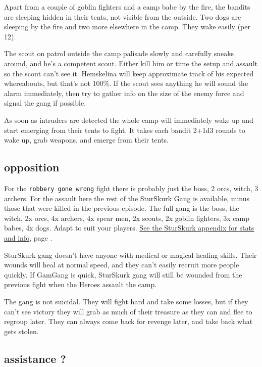 Apart from a couple of goblin fighters and a camp babe by the fire, the bandits are sleeping hidden in their tents, not visible from the outside. Two dogs are sleeping by the fire and two more elsewhere in the camp. They wake easily (per 12).

The scout on patrol outside the camp palisade slowly and carefully sneaks around, and he's a competent scout. Either kill him or time the setup and assault so the scout can't see it. Hemskelina will keep approximate track of his expected whereabouts, but that's not 100\%. If the scout sees anything he will sound the alarm immediately, then try to gather info on the size of the enemy force and signal the gang if possible.

As soon as intruders are detected the whole camp will immediately wake up and start emerging from their tents to fight. It takes each bandit 2+1d3 rounds to wake up, grab weapons, and emerge from their tents.


\subsection*{opposition}

For the \texttt{robbery gone wrong} fight there is probably just the boss, 2 orcs, witch, 3 archers. For the assault here the rest of the SturSkurk Gang is available, minus those that were killed in the previous episode. The full gang is the boss, the witch, 2x orcs, 4x archers, 4x spear men, 2x scouts, 2x goblin fighters, 3x camp babes, 4x dogs. Adapt to suit your players. 
\hyperref[appendixsturskurk]{See the SturSkurk appendix for stats and info}, page \pageref{appendixsturskurk}.

SturSkurk gang doesn't have anyone with medical or magical healing skills. Their wounds will heal at normal speed, and they can't easily recruit more people quickly. If GamGang is quick, SturSkurk gang will still be wounded from the previous fight when the Heroes assault the camp. 

The gang is not suicidal. They will fight hard and take some losses, but if they can't see victory they will grab as much of their treasure as they can and flee to regroup later. They can always come back for revenge later, and take back what gets stolen.


\subsection*{assistance ?}

